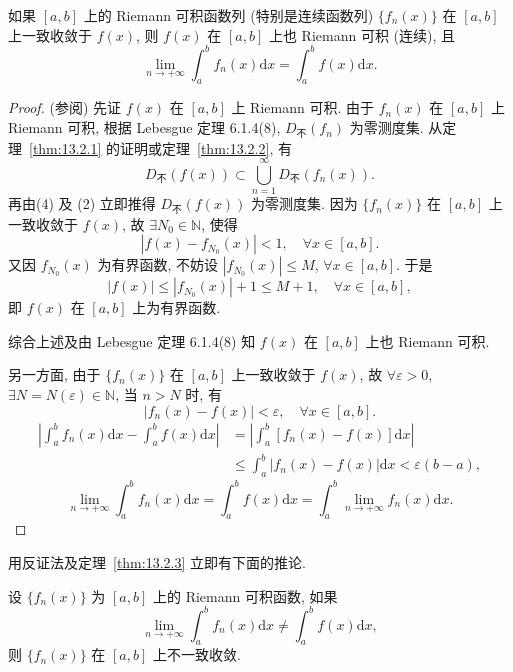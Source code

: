 \begin{theorem}\label{thm:13.2.3}
如果 $[a,b]$ 上的 Riemann 可积函数列 (特别是连续函数列) $\{f_{n}(x)\}$ 在 $[a,b]$ 上一致收敛于 $f(x)$, 则 $f(x)$ 在 $[a,b]$ 上也 Riemann 可积 (连续), 且
\[
  \lim_{n\to+\infty}\int_{a}^{b}f_{n}(x)\mathrm{d}x=\int_{a}^{b}f(x)\mathrm{d}x.
\]
\end{theorem}

\begin{proof}
(参阅) 先证 $f(x)$ 在 $[a,b]$ 上 Riemann 可积. 由于 $f_{n}(x)$ 在 $[a,b]$ 上 Riemann 可积, 根据 Lebesgue 定理 6.1.4(8), $D_{\text{不}}(f_{n})$ 为零测度集. 从定理~\ref{thm:13.2.1} 的证明或定理~\ref{thm:13.2.2}, 有
\[
  D_{\text{不}}(f(x))\subset\bigcup_{n=1}^{\infty}D_{\text{不}}(f_{n}(x)).
\]
再由(4) 及 (2) 立即推得 $D_{\text{不}}(f(x))$ 为零测度集. 因为 $\{f_{n}(x)\}$ 在 $[a,b]$ 上一致收敛于 $f(x)$, 故 $\exists N_{0}\in\mathbb{N}$, 使得
\[
  |f(x)-f_{N_{0}}(x)|<1,\quad\forall x\in[a,b].
\]
又因 $f_{N_{0}}(x)$ 为有界函数, 不妨设 $|f_{N_{0}}(x)|\leqslant M$, $\forall x\in[a,b]$. 于是
\[
  |f(x)|\leqslant|f_{N_{0}}(x)|+1\leqslant M+1,\quad\forall x\in[a,b],
\]
即 $f(x)$ 在 $[a,b]$ 上为有界函数.

综合上述及由 Lebesgue 定理 6.1.4(8) 知 $f(x)$ 在 $[a,b]$ 上也 Riemann 可积.

另一方面, 由于 $\{f_{n}(x)\}$ 在 $[a,b]$ 上一致收敛于 $f(x)$, 故 $\forall\varepsilon>0$, $\exists N=N(\varepsilon)\in\mathbb{N}$, 当 $n>N$ 时, 有
\[
  |f_{n}(x)-f(x)|<\varepsilon,\quad\forall x\in[a,b].
\]
\[
  \begin{aligned}
    \left|\int_{a}^{b}f_{n}(x)\mathrm{d}x-\int_{a}^{b}f(x)\mathrm{d}x\right|&=\left|\int_{a}^{b}[f_{n}(x)-f(x)]\mathrm{d}x\right|\\
    &\leqslant\int_{a}^{b}|f_{n}(x)-f(x)|\mathrm{d}x<\varepsilon(b-a),
  \end{aligned}
\]
\[
  \lim_{n\to+\infty}\int_{a}^{b}f_{n}(x)\mathrm{d}x=\int_{a}^{b}f(x)\mathrm{d}x=\int_{a}^{b}\lim_{n\to+\infty}f_{n}(x)\mathrm{d}x.
\]
\end{proof}

用反证法及定理~\ref{thm:13.2.3} 立即有下面的推论.

\begin{corollary}\label{cor:13.2.3}
设 $\{f_{n}(x)\}$ 为 $[a,b]$ 上的 Riemann 可积函数, 如果
\[
  \lim_{n\to+\infty}\int_{a}^{b}f_{n}(x)\mathrm{d}x\neq\int_{a}^{b}f(x)\mathrm{d}x,
\]
则 $\{f_{n}(x)\}$ 在 $[a,b]$ 上不一致收敛.
\end{corollary}

